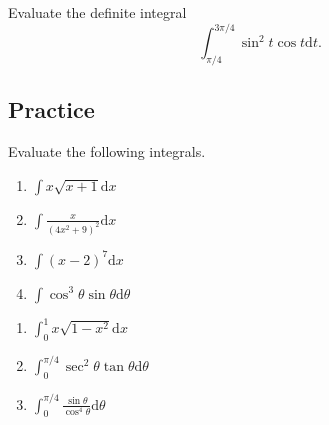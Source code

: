 \begin{example}

Evaluate the definite integral
\[\displaystyle \int^{3\pi/4}_{\pi/4}\sin^2 t\cos t\mathrm{d} t.\]

\end{example}
\vspace*{6\baselineskip}

\subsection{Practice}

\begin{exercise}

Evaluate the following integrals.

\begin{enumerate}
\item
  \(\displaystyle \int x\sqrt{x+1}\mathrm{d} x\)
\item
  \(\displaystyle \int\frac{x}{(4x^2+9)^2}\mathrm{d} x\)
\item
  \(\displaystyle \int(x - 2)^7\mathrm{d} x\)
\item
  \(\displaystyle \int\cos^3 \theta\sin \theta\mathrm{d} \theta\)
\end{enumerate}

\end{exercise}

\begin{exercise}

\begin{enumerate}
\item
  \(\displaystyle \int^1_0x\sqrt{1 - x^2}\mathrm{d} x\)
\item
  \(\displaystyle \int^{\pi/4}_0\sec^2 \theta \tan \theta \mathrm{d} \theta \)
\item
  \(\displaystyle \int^{\pi/4}_0\frac{\sin \theta }{\cos^4 \theta }\mathrm{d} \theta \)
\end{enumerate}

\end{exercise}


